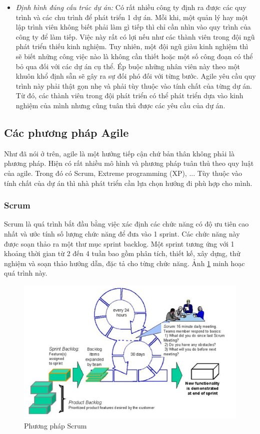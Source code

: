 \documentclass{article}
\begin{document}
\begin{itemize}
	\item \textit{Định hình đúng cấu trúc dự án:} Có rất nhiều công ty định ra được các quy trình và các chu trình để phát triển 1 dự án. Mỗi khi, một quản lý hay một lập trình viên không biết phải làm gì tiếp thì chỉ cần nhìn vào quy trình của công ty để làm tiếp. Việc này rất có lợi nếu như các thành viên trong đội ngũ phát triển thiếu kinh nghiệm. Tuy nhiên, một đội ngũ giàu kinh nghiệm thì sẽ biết những công việc nào là không cần thiết hoặc một số công đoạn có thể bỏ qua đối với các dự án cụ thể. Ép buộc những nhân viên này theo một khuôn khổ định sẵn sẽ gây ra sự đối phó đối với từng bước. Agile yêu cầu quy trình này phải thật gọn nhẹ và phải tùy thuộc vào tính chất của từng dự án. Từ đó, các thành viên trong đội phát triển có thể phát triển dựa vào kinh nghiệm của mình nhưng cũng tuân thủ được các yêu cầu của dự án. 
	\end{itemize}
	
\subsection{Các phương pháp Agile}

Như đã nói ở trên, agile là một hướng tiếp cận chứ bản thân không phải là phương pháp. Hiện có rất nhiều mô hình và phương pháp tuân thủ theo quy luật của agile. Trong đó có Scrum, Extreme programming (XP), ... Tùy thuộc vào tính chất của dự án thì nhà phát triển cần lựa chọn hướng đi phù hợp cho mình. 

\subsubsection{Scrum}

Scrum là quá trình bắt đầu bằng việc xác định các chức năng có độ ưu tiên cao nhất và ước tính số lượng chức năng để đưa vào 1 sprint. Các chức năng này được soạn thảo ra một thư mục sprint backlog. Một sprint tương ứng với 1 khoảng thời gian từ 2 đến 4 tuần bao gồm phân tích, thiết kế, xây dựng, thử nghiệm và soạn thảo hướng dẫn, đặc tả cho từng chức năng. Ảnh \ref{fig:scrum} minh hoạc quá trình này. 

\begin{figure}[h]
	\centering
	\includegraphics[scale=0.3]{figures/scrum.png}
	\caption{Phương pháp Scrum \cite{poccia1970}}
	\label{fig:scrum}
\end{figure}
\end{document}
